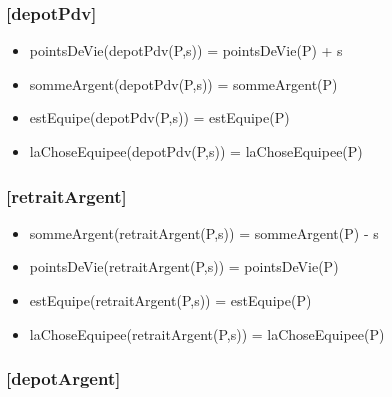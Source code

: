 \documentclass[11pt]{article}
\begin{document}
\subsubsection{[depotPdv]}
\label{sec-1.7.4}

\begin{itemize}

\item pointsDeVie(depotPdv(P,s)) = pointsDeVie(P) + s\\
\label{sec-1.7.4.1}


\item sommeArgent(depotPdv(P,s)) = sommeArgent(P)\\
\label{sec-1.7.4.2}


\item estEquipe(depotPdv(P,s)) = estEquipe(P)\\
\label{sec-1.7.4.3}


\item laChoseEquipee(depotPdv(P,s)) = laChoseEquipee(P)\\
\label{sec-1.7.4.4}


\end{itemize} %
\subsubsection{[retraitArgent]}
\label{sec-1.7.5}

\begin{itemize}

\item sommeArgent(retraitArgent(P,s)) = sommeArgent(P) - s\\
\label{sec-1.7.5.1}


\item pointsDeVie(retraitArgent(P,s)) = pointsDeVie(P)\\
\label{sec-1.7.5.2}


\item estEquipe(retraitArgent(P,s)) = estEquipe(P)\\
\label{sec-1.7.5.3}


\item laChoseEquipee(retraitArgent(P,s)) = laChoseEquipee(P)\\
\label{sec-1.7.5.4}


\end{itemize} %
\subsubsection{[depotArgent]}
\label{sec-1.7.6}
\end{document}
